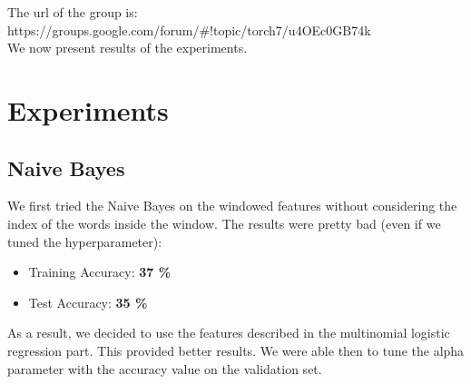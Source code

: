 \documentclass[11pt]{article}
\begin{document}
\noindent The url of the group is: https://groups.google.com/forum/\#!topic/torch7/u4OEc0GB74k\\

\noindent We now present results of the experiments.

\section{Experiments}

\subsection{Naive Bayes}

We first tried the Naive Bayes on the windowed features without considering the index of the words inside the window. The results were pretty bad (even if we tuned the hyperparameter):
\begin{itemize}
	\item Training Accuracy: \textbf{37 \%}
	\item Test Accuracy: \textbf{35 \%}
\end{itemize}

As a result, we decided to use the features described in the multinomial logistic regression part. This provided better results. We were able then to tune the alpha parameter with the accuracy value on the validation set.
\end{document}
